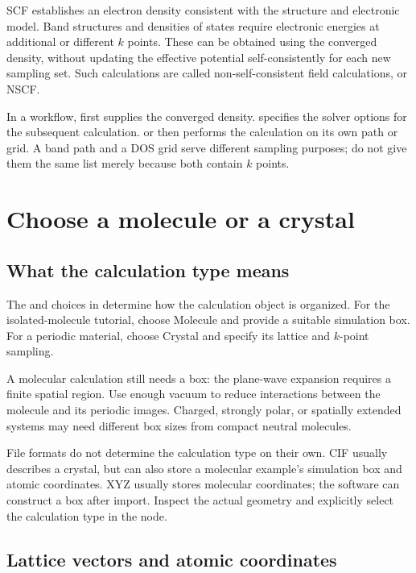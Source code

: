 SCF establishes an electron density consistent with the structure and electronic model. Band structures and densities of states require electronic energies at additional or different $k$ points. These can be obtained using the converged density, without updating the effective potential self-consistently for each new sampling set. Such calculations are called non-self-consistent field calculations, or NSCF.

In a workflow,  first supplies the converged density.  specifies the solver options for the subsequent calculation.  or  then performs the calculation on its own path or grid. A band path and a DOS grid serve different sampling purposes; do not give them the same list merely because both contain $k$ points.

\section{Choose a molecule or a crystal}

\subsection{What the calculation type means}

The  and  choices in  determine how the calculation object is organized. For the isolated-molecule tutorial, choose Molecule and provide a suitable simulation box. For a periodic material, choose Crystal and specify its lattice and $k$-point sampling.

A molecular calculation still needs a box: the plane-wave expansion requires a finite spatial region. Use enough vacuum to reduce interactions between the molecule and its periodic images. Charged, strongly polar, or spatially extended systems may need different box sizes from compact neutral molecules.

File formats do not determine the calculation type on their own. CIF usually describes a crystal, but can also store a molecular example's simulation box and atomic coordinates. XYZ usually stores molecular coordinates; the software can construct a box after import. Inspect the actual geometry and explicitly select the calculation type in the node.

\subsection{Lattice vectors and atomic coordinates}

